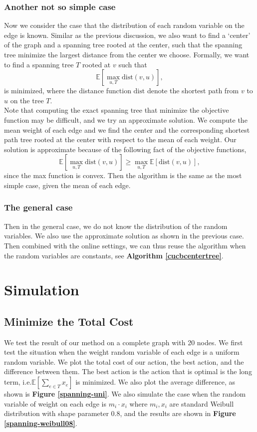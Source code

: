 \documentclass{article}
\theoremstyle{plain}
\theoremstyle{definition}
\theoremstyle{remark}
\begin{document}
    \subsubsection{Another not so simple case}
    Now we consider the case that the distribution of each random variable on the edge is known. Similar as the previous discussion, we also want to find a `center' of the graph and a spanning tree rooted at the center, such that the spanning tree minimize the largest distance from the center we choose. Formally, we want to find a spanning tree $T$ rooted at $v$ such that
    \[\mathbb E[\max_{u,T}\text{dist}(v,u)],\]
    is minimized, where the distance function $\text{dist}$ denote the shortest path from $v$ to $u$ on the tree $T$.\\

    Note that computing the exact spanning tree that minimize the objective function may be difficult, and we try an approximate solution. We compute the mean weight of each edge and we find the center and the corresponding shortest path tree rooted at the center with respect to the mean of each weight. Our solution is approximate because of the following fact of the objective functions,
    \[\mathbb E[\max_{u,T}\text{dist}(v,u)] \ge \max_{u,T}\mathbb E[\text{dist}(v,u)],\]
    since the max function is convex. Then the algorithm is the same as the most simple case, given the mean of each edge.

    \subsubsection{The general case}
    Then in the general case, we do not know the distribution of the random variables. We also use the approximate solution as shown in the previous case. Then combined with the online settings, we can thus reuse the algorithm when the random variables are constants, see \textbf{Algorithm \ref{cucbcentertree}}.

    \section{Simulation}
    \subsection{Minimize the Total Cost}

    We test the result of our method on a complete graph with 20 nodes. We first test the situation when the weight random variable of each edge is a uniform random variable. We plot the total cost of our action, the best action, and the difference between them. The best action is the action that is optimal is the long term, i.e.$\mathbb E[\sum_{e\in T}x_e]$ is minimized. We also plot the average difference, as shown is \textbf{Figure \ref{spanning-uni}}. We also simulate the case when the random variable of weight on each edge is $m_i\cdot x_i$ where $m_i,x_i$ are standard Weibull distribution with shape parameter $0.8$, and the results are shown in \textbf{Figure \ref{spanning-weibull08}}.
\end{document}
